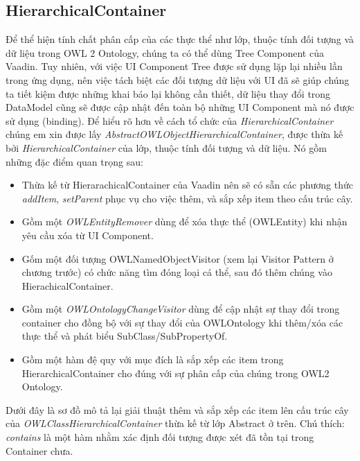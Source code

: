 \subsection{HierarchicalContainer}
Để thể hiện tính chất phân cấp của các thực thể như lớp, thuộc tính đối tượng và dữ liệu trong OWL 2 Ontology, chúng ta có thể dùng Tree Component của Vaadin. Tuy nhiên, với việc UI Component Tree được sử dụng lặp lại nhiều lần trong ứng dụng, nên việc tách biệt các đối tượng dữ liệu với UI đã sẽ giúp chúng ta tiết kiệm được những khai báo lại không cần thiết, dữ liệu thay đổi trong DataModel cũng sẽ được cập nhật đến toàn bộ những UI Component mà nó được sử dụng (binding). Để hiểu rõ hơn về cách tổ chức của \textit{HierarchicalContainer} chúng em xin được lấy  \textit{AbstractOWLObjectHierarchicalContainer}, được thừa kế bởi \textit{HierarchicalContainer} của lớp, thuộc tính đối tượng và dữ liệu. Nó gồm những đặc điểm quan trọng sau:
\begin{itemize}
\item Thừa kế từ HierarachicalContainer của Vaadin nên sẽ có sẵn các phương thức \textit{addItem}, \textit{setParent} phục vụ cho việc thêm, và sắp xếp item theo cấu trúc cây.
\item Gồm một \textit{OWLEntityRemover} dùng để xóa thực thể (OWLEntity) khi nhận yêu cầu xóa từ UI Component.
\item Gốm một đối tượng OWLNamedObjectVisitor (xem lại Visitor Pattern ở chương trước) có chức năng tìm đóng loại cá thể, sau đó thêm chúng vào HierachicalContainer.
\item Gồm một \textit{OWLOntologyChangeVisitor} dùng để cập nhật sự thay đổi trong container cho đồng bộ với sự thay đổi của OWLOntology khi thêm/xóa các thực thể và phát biểu SubClass/SubPropertyOf.
\item Gồm một hàm đệ quy với mục đích là sắp xếp các item trong HierarchicalContainer cho đúng với sự phân cấp của chúng trong OWL2 Ontology.
\end{itemize}
Dưới đây là sơ đồ mô tả lại giải thuật thêm và sắp xếp các item lên cấu trúc cây của \textit{OWLClassHierarchicalContainer} thừa kế từ lớp Abstract ở trên. Chú thích: \textit{contains} là một hàm nhằm xác định đối tượng được xét đã tồn tại trong Container chưa.
